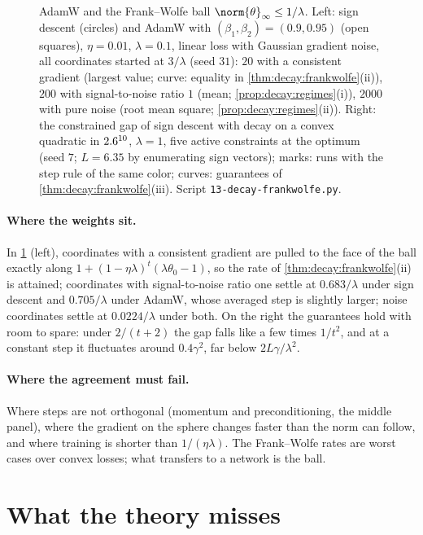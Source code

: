 \begin{refsection}
\begin{figure}[t]
\begin{fullwidth}
\end{fullwidth}
\caption{AdamW and the Frank--Wolfe ball $\norm{\theta}_\infty\le1/\lambda$. Left: sign descent (circles) and AdamW with $(\beta_1,\beta_2)=(0.9,0.95)$ (open squares), $\eta=0.01$, $\lambda=0.1$, linear loss with Gaussian gradient noise, all coordinates started at $3/\lambda$ (seed $31$): $20$ with a consistent gradient (largest value; curve: equality in \cref{thm:decay:frankwolfe}(ii)), $200$ with signal-to-noise ratio $1$ (mean; \cref{prop:decay:regimes}(i)), $2000$ with pure noise (root mean square; \cref{prop:decay:regimes}(ii)). Right: the constrained gap of sign descent with decay on a convex quadratic in $2.6^{10}$, $\lambda=1$, five active constraints at the optimum (seed $7$; $L=6.35$ by enumerating sign vectors); marks: runs with the step rule of the same color; curves: guarantees of \cref{thm:decay:frankwolfe}(iii). Script \texttt{13-decay-frankwolfe.py}.}
\label{fig:decay:frankwolfe}
\end{figure}

\paragraph{Where the weights sit.} In \cref{fig:decay:frankwolfe} (left), coordinates with a consistent gradient are pulled to the face of the ball exactly along $1+(1-\eta\lambda)^t(\lambda\theta_0-1)$, so the rate of \cref{thm:decay:frankwolfe}(ii) is attained; coordinates with signal-to-noise ratio one settle at $0.683/\lambda$ under sign descent and $0.705/\lambda$ under AdamW, whose averaged step is slightly larger; noise coordinates settle at $0.0224/\lambda$ under both. On the right the guarantees hold with room to spare: under $2/(t+2)$ the gap falls like a few times $1/t^2$, and at a constant step it fluctuates around $0.4\gamma^2$, far below $2L\gamma/\lambda^2$.

\paragraph{Where the agreement must fail.} Where steps are not orthogonal (momentum and preconditioning, the middle panel), where the gradient on the sphere changes faster than the norm can follow, and where training is shorter than $1/(\eta\lambda)$. The Frank--Wolfe rates are worst cases over convex losses; what transfers to a network is the ball.

\section{What the theory misses}\label{sec:decay:misses}


\end{refsection}
